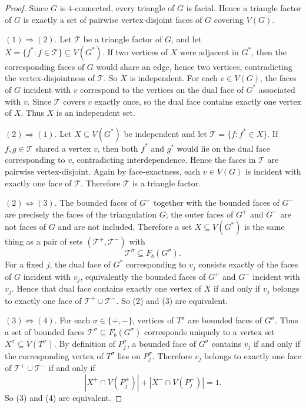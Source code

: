 \documentclass{patmorin}
\begin{document}
\begin{proof}
Since $G$ is $4$-connected, every triangle of $G$ is facial. Hence a
triangle factor of $G$ is exactly a set of pairwise vertex-disjoint faces of
$G$ covering $V(G)$.

$(1)\Rightarrow(2)$.
Let $\mathcal T$ be a triangle factor of $G$, and let
$X=\{f^*:f\in\mathcal T\}\subseteq V(G^*)$.
If two vertices of $X$ were adjacent in $G^*$, then the corresponding faces
of $G$ would share an edge, hence two vertices, contradicting the
vertex-disjointness of $\mathcal T$. So $X$ is independent.
For each $v\in V(G)$, the faces of $G$ incident with $v$ correspond to
the vertices on the dual face of $G^*$ associated with $v$. Since
$\mathcal T$ covers $v$ exactly once, so the dual face contains exactly one
vertex of $X$. Thus $X$ is an independent set.

$(2)\Rightarrow(1)$.
Let $X\subseteq V(G^*)$ be independent and let $\mathcal T=\{f:f^*\in X\}$.
If $f,g\in\mathcal T$ shared a vertex $v$, then both $f^*$ and $g^*$
would lie on the dual face corresponding to $v$, contradicting interdependence. 
Hence the faces in $\mathcal T$ are pairwise vertex-disjoint.
Again by face-exactness, each $v\in V(G)$ is incident with exactly one face
of $\mathcal T$. Therefore $\mathcal T$ is a triangle factor.

$(2)\Leftrightarrow(3)$.
The bounded faces of $G^+$ together with the bounded faces of $G^-$ are
precisely the faces of the triangulation $G$; the outer faces of $G^+$ and
$G^-$ are not faces of $G$ and are not included. Therefore a set
$X\subseteq V(G^*)$ is the same thing as a pair of sets
$(\mathcal T^+,\mathcal T^-)$ with
\[
\mathcal T^\sigma\subseteq F_b(G^\sigma).
\]
For a fixed $j$, the dual face of $G^*$ corresponding to $v_j$ consists
exactly of the faces of $G$ incident with $v_j$, equivalently the bounded
faces of $G^+$ and $G^-$ incident with $v_j$.
Hence that dual face contains exactly one vertex of $X$ if and only if
$v_j$ belongs to exactly one face of $\mathcal T^+\cup\mathcal T^-$.
So (2) and (3) are equivalent.

$(3)\Leftrightarrow(4)$.
For each $\sigma\in\{+,-\}$, vertices of $T^\sigma$ are bounded faces of
$G^\sigma$. Thus a set of bounded faces
$\mathcal T^\sigma\subseteq F_b(G^\sigma)$ corresponds uniquely to a vertex
set $X^\sigma\subseteq V(T^\sigma)$.
By definition of $P_j^\sigma$, a bounded face of $G^\sigma$ contains $v_j$
if and only if the corresponding vertex of $T^\sigma$ lies on $P_j^\sigma$.
Therefore $v_j$ belongs to exactly one face of
$\mathcal T^+\cup\mathcal T^-$ if and only if
\[
|X^+\cap V(P_j^+)|+|X^-\cap V(P_j^-)|=1.
\]
So (3) and (4) are equivalent.
\end{proof}
\end{document}
